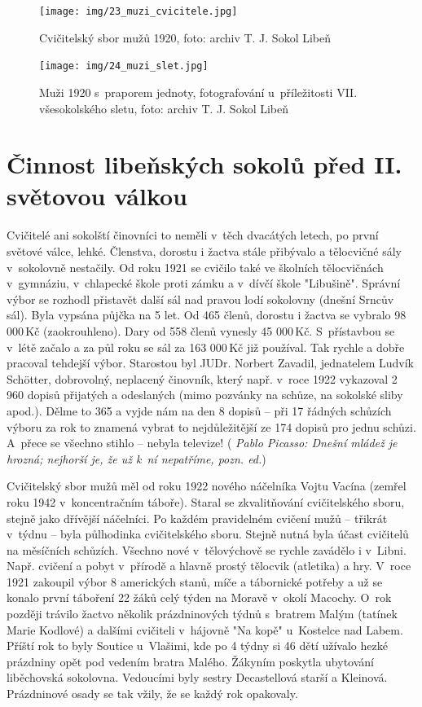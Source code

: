 \documentclass[a5paper, 11pt, twoside]{article}
\newcommand{\pozned}[1]{%
\textit{#1}}
\begin{document}
\begin{figure}[h!]
  \centering 
  \texttt{[image: img/23\_muzi\_cvicitele.jpg]}
  \caption*{Cvičitelský sbor mužů 1920, foto: archiv T. J. Sokol Libeň}
\end{figure}

\begin{figure}[h!]
  \centering 
  \texttt{[image: img/24\_muzi\_slet.jpg]}
  \caption*{Muži 1920 s~praporem jednoty, fotografování u~příležitosti VII. všesokolského sletu, foto: archiv T. J. Sokol Libeň}
\end{figure}


\section{Činnost libeňských sokolů před II. světovou
válkou}

Cvičitelé ani sokolští činovníci to neměli v~těch dvacátých letech, po
první světové válce, lehké. Členstva, dorostu i žactva stále přibývalo a
tělocvičné sály v~sokolovně nestačily. Od roku 1921 se cvičilo také ve
školních tělocvičnách v~gymnáziu, v~chlapecké škole proti zámku a
v~dívčí škole "Libušině". Správní výbor se rozhodl přistavět další sál
nad pravou lodí sokolovny (dnešní Srncův sál). Byla vypsána půjčka na 5
let. Od 465 členů, dorostu i žactva se vybralo 98 000\,Kč (zaokrouhleno).
Dary od 558 členů vynesly 45 000\,Kč. S~přístavbou se v~létě začalo a za
půl roku se sál za 163 000\,Kč již používal. Tak rychle a dobře pracoval
tehdejší výbor. Starostou byl JUDr. Norbert Zavadil, jednatelem Ludvík
Schötter, dobrovolný, neplacený činovník, který např. v~roce 1922
vykazoval 2 960 dopisů přijatých a odeslaných (mimo pozvánky na schůze,
na sokolské sliby apod.). Dělme to 365 a vyjde nám na den 8 dopisů --
při 17 řádných schůzích výboru za rok to znamená vybrat to
nejdůležitější ze 174 dopisů pro jednu schůzi. A~přece se všechno stihlo
-- nebyla televize! (\pozned{Pablo Picasso: Dnešní mládež je hrozná;
nejhorší je, že už k~ní nepatříme, pozn. ed.})

Cvičitelský sbor mužů měl od roku 1922 nového náčelníka Vojtu Vacína
(zemřel roku 1942 v~koncentračním táboře). Staral se zkvalitňování
cvičitelského sboru, stejně jako dřívější náčelníci. Po každém
pravidelném cvičení mužů -- třikrát v~týdnu -- byla půlhodinka
cvičitelského sboru. Stejně nutná byla účast cvičitelů na měsíčních
schůzích. Všechno nové v~tělovýchově se rychle zavádělo i v~Libni. Např.
cvičení a pobyt v~přírodě a hlavně prostý tělocvik (atletika) a hry.
V~roce 1921 zakoupil výbor 8 amerických stanů, míče a tábornické potřeby a
už se konalo první táboření 22 žáků celý týden na Moravě v~okolí
Macochy. O~rok později trávilo žactvo několik prázdninových týdnů
s~bratrem Malým (tatínek Marie Kodlové) a dalšími cvičiteli v~hájovně "Na
kopě" u~Kostelce nad Labem. Příští rok to byly Soutice u~Vlašimi, kde
po 4 týdny si 46 dětí užívalo hezké prázdniny opět pod vedením bratra
Malého. Žákyním poskytla ubytování liběchovská sokolovna. Vedoucími byly
sestry Decastellová starší a Kleinová. Prázdninové osady se tak vžily,
že se každý rok opakovaly.
\end{document}

